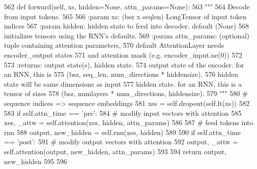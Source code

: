 \begin{DoxyCode}
562     \textcolor{keyword}{def }forward(self, xs, hidden=None, attn\_params=None):
563         \textcolor{stringliteral}{"""}
564 \textcolor{stringliteral}{        Decode from input tokens.}
565 \textcolor{stringliteral}{}
566 \textcolor{stringliteral}{        :param xs:          (bsz x seqlen) LongTensor of input token indices}
567 \textcolor{stringliteral}{        :param hidden:      hidden state to feed into decoder. default (None)}
568 \textcolor{stringliteral}{                            initializes tensors using the RNN's defaults.}
569 \textcolor{stringliteral}{        :param attn\_params: (optional) tuple containing attention parameters,}
570 \textcolor{stringliteral}{                            default AttentionLayer needs encoder\_output states}
571 \textcolor{stringliteral}{                            and attention mask (e.g. encoder\_input.ne(0))}
572 \textcolor{stringliteral}{}
573 \textcolor{stringliteral}{        :returns:           output state(s), hidden state.}
574 \textcolor{stringliteral}{                            output state of the encoder. for an RNN, this is}
575 \textcolor{stringliteral}{                            (bsz, seq\_len, num\_directions * hiddensize).}
576 \textcolor{stringliteral}{                            hidden state will be same dimensions as input}
577 \textcolor{stringliteral}{                            hidden state. for an RNN, this is a tensor of sizes}
578 \textcolor{stringliteral}{                            (bsz, numlayers * num\_directions, hiddensize).}
579 \textcolor{stringliteral}{        """}
580         \textcolor{comment}{# sequence indices => sequence embeddings}
581         xes = self.dropout(self.lt(xs))
582 
583         \textcolor{keywordflow}{if} self.attn\_time == \textcolor{stringliteral}{'pre'}:
584             \textcolor{comment}{# modify input vectors with attention}
585             xes, \_attw = self.attention(xes, hidden, attn\_params)
586 
587         \textcolor{comment}{# feed tokens into rnn}
588         output, new\_hidden = self.rnn(xes, hidden)
589 
590         \textcolor{keywordflow}{if} self.attn\_time == \textcolor{stringliteral}{'post'}:
591             \textcolor{comment}{# modify output vectors with attention}
592             output, \_attw = self.attention(output, new\_hidden, attn\_params)
593 
594         \textcolor{keywordflow}{return} output, new\_hidden
595 
596 
\end{DoxyCode}


